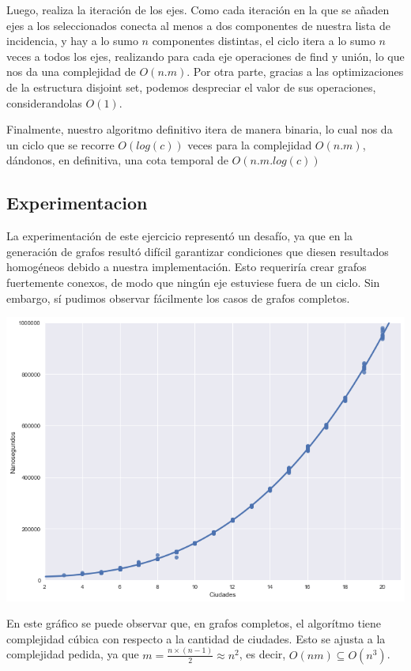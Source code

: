 Luego, realiza la iteración de los ejes. Como cada iteración en la que se añaden ejes a los seleccionados conecta al menos a dos componentes de nuestra lista de incidencia, y hay a lo sumo $n$ componentes distintas, el ciclo itera a lo sumo $n$ veces a todos los ejes, realizando para cada eje operaciones de find y unión, lo que nos da una complejidad de $O(n.m)$. Por otra parte, gracias a las optimizaciones de la estructura disjoint set, podemos despreciar el valor de sus operaciones, considerandolas $O(1)$.

Finalmente, nuestro algoritmo definitivo itera de manera binaria, lo cual nos da un ciclo que se recorre $O(log(c))$ veces para la complejidad $O(n.m)$, dándonos, en definitiva, una cota temporal de $O(n.m.log(c))$

\subsection{Experimentacion}

La experimentación de este ejercicio representó un desafío, ya que en la generación de grafos resultó difícil garantizar condiciones que diesen resultados homogéneos debido a nuestra implementación. Esto requeriría crear grafos fuertemente conexos, de modo que ningún eje estuviese fuera de un ciclo. Sin embargo, sí pudimos observar fácilmente los casos de grafos completos.

\begin{center}
	\includegraphics[scale=0.5]{imagenes/ej2-1.png}
\end{center}

En este gráfico se puede observar que, en grafos completos, el algorítmo tiene complejidad cúbica con respecto a la cantidad de ciudades. Esto se ajusta a la complejidad pedida, ya que $m = \frac{n \times (n-1)}{2} \approx n^2$, es decir, $O(n m) \subseteq O(n^3)$.

